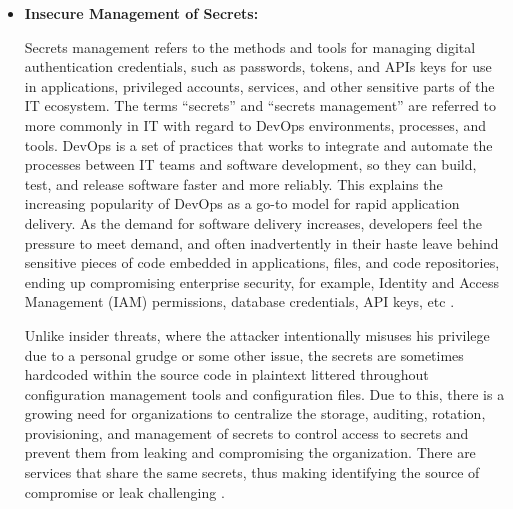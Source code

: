 \begin{itemize}
    \item \textbf{Insecure Management of Secrets:} \par Secrets management refers to the methods and tools for managing digital authentication credentials, such as passwords, tokens, and APIs keys for use in applications, privileged accounts, services, and other sensitive parts of the IT ecosystem. The terms “secrets” and “secrets management” are referred to more commonly in IT with regard to DevOps environments, processes, and tools. DevOps is a set of practices that works to integrate and automate the processes between IT teams and software development, so they can build, test, and release software faster and more reliably. This explains the increasing popularity of DevOps as a go-to model for rapid application delivery. As the demand for software delivery increases, developers feel the pressure to meet demand, and often inadvertently in their haste leave behind sensitive pieces of code embedded in applications, files, and code repositories, ending up compromising enterprise security, for example, Identity and Access Management (IAM) permissions, database credentials, API keys, etc \cite{61}.

    Unlike insider threats, where the attacker intentionally misuses his privilege due to a personal grudge or some
    other issue, the secrets are sometimes hardcoded within the source code in plaintext littered throughout configuration management tools and configuration files.
    Due to this, there is a growing need for organizations to centralize the storage, auditing, rotation, provisioning, and management of secrets to control access to secrets and prevent them from leaking and compromising the organization. There are services that share the same secrets, thus making identifying the source of compromise or leak challenging \cite{62}.
\end{itemize}

